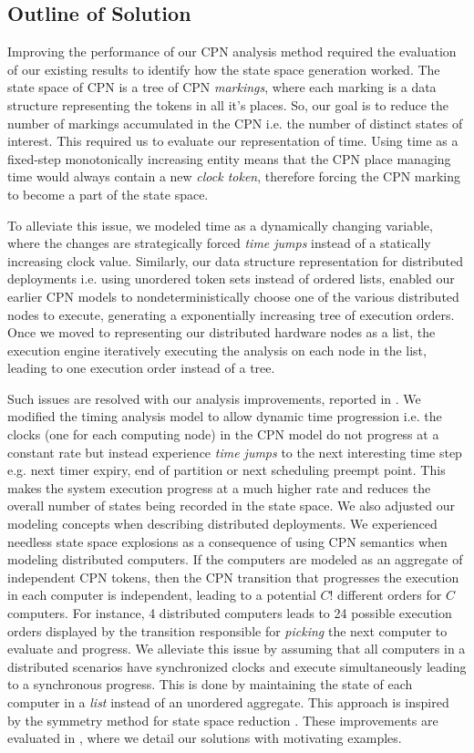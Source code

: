 \subsection{Outline of Solution}
Improving the performance of our CPN analysis method required the evaluation of our existing results to identify how the state space generation worked. The state space of CPN is a tree of CPN \emph{markings}, where each marking is a data structure representing the tokens in all it's places. So, our goal is to reduce the number of markings accumulated in the CPN i.e. the number of distinct states of interest. This required us to evaluate our representation of time. Using time as a fixed-step monotonically increasing entity means that the CPN place managing time would always contain a new \emph{clock token}, therefore forcing the CPN marking to become a part of the state space.

To alleviate this issue, we modeled time as a dynamically changing variable, where the changes are strategically forced \emph{time jumps} instead of a statically increasing clock value. Similarly, our data structure representation for distributed deployments i.e. using unordered token sets instead of ordered lists, enabled our earlier CPN models to nondeterministically choose one of the various distributed nodes to execute, generating a exponentially increasing tree of execution orders. Once we moved to representing our distributed hardware nodes as a list, the execution engine iteratively executing the analysis on each node in the list, leading to one execution order instead of a tree. 

Such issues are resolved with our analysis improvements, reported in \cite{SEUS}. We modified the timing analysis model to allow dynamic time progression i.e. the clocks (one for each computing node) in the CPN model do not progress at a constant rate but instead experience \emph{time jumps} to the next interesting time step e.g. next timer expiry, end of partition or next scheduling preempt point. This makes the system execution progress at a much higher rate and reduces the overall number of states being recorded in the state space. We also adjusted our modeling concepts when describing distributed deployments. We experienced needless state space explosions as a consequence of using CPN semantics when modeling distributed computers. If the computers are modeled as an aggregate of independent CPN tokens, then the CPN transition that progresses the execution in each computer is independent, leading to a potential $C!$ different orders for $C$ computers. For instance, 4 distributed computers leads to 24 possible execution orders displayed by the transition responsible for \emph{picking} the next computer to evaluate and progress. We alleviate this issue by assuming that all computers in a distributed scenarios have synchronized clocks and execute simultaneously leading to a synchronous progress. This is done by maintaining the state of each computer in a \emph{list} instead of an unordered aggregate. This approach is inspired by the symmetry method for state space reduction \cite{Kristensen2000}. These improvements are evaluated in \cite{SEUS}, where we detail our solutions with motivating examples. 

